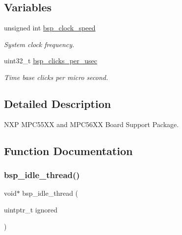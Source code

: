 \subsection*{Variables}
\begin{DoxyCompactItemize}
\item 
\mbox{\label{group__RTEMSBSPsPowerPCMPC55XX_gaba9da0e1051e94af45015aa2b1c30cfb}} 
unsigned int \mbox{\hyperlink{group__RTEMSBSPsPowerPCMPC55XX_gaba9da0e1051e94af45015aa2b1c30cfb}{bsp\+\_\+clock\+\_\+speed}}
\begin{DoxyCompactList}\small\item\em System clock frequency. \end{DoxyCompactList}\item 
\mbox{\label{group__RTEMSBSPsPowerPCMPC55XX_gabfae404b02d5b3193b9420930d97d84a}} 
uint32\+\_\+t \mbox{\hyperlink{group__RTEMSBSPsPowerPCMPC55XX_gabfae404b02d5b3193b9420930d97d84a}{bsp\+\_\+clicks\+\_\+per\+\_\+usec}}
\begin{DoxyCompactList}\small\item\em Time base clicks per micro second. \end{DoxyCompactList}\end{DoxyCompactItemize}


\subsection{Detailed Description}
N\+XP M\+P\+C55\+XX and M\+P\+C56\+XX Board Support Package. 



\subsection{Function Documentation}
\mbox{\label{group__RTEMSBSPsPowerPCMPC55XX_ga4617d29eb64a6f41a54d9f997b97d758}} 
\subsubsection{\texorpdfstring{bsp\_idle\_thread()}{bsp\_idle\_thread()}}
{\footnotesize\ttfamily void$\ast$ bsp\+\_\+idle\+\_\+thread (\begin{DoxyParamCaption}\item[{uintptr\+\_\+t}]{ignored }\end{DoxyParamCaption})}



